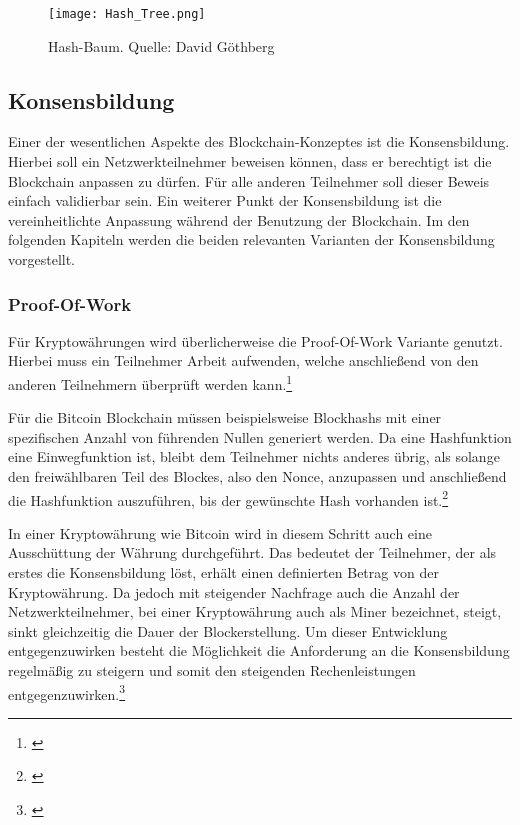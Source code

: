 \begin{figure}[!h]
	\texttt{[image: Hash\_Tree.png]}
	\caption{Hash-Baum. Quelle: David Göthberg}
	\label{fig:hash-tree}
\end{figure}

\subsection{Konsensbildung}
\label{subsec:Konsensbildung}
Einer der wesentlichen Aspekte des Blockchain-Konzeptes ist die Konsensbildung. Hierbei soll ein Netzwerkteilnehmer beweisen können, dass er berechtigt ist die Blockchain anpassen zu dürfen. Für alle anderen Teilnehmer soll dieser Beweis einfach validierbar sein. Ein weiterer Punkt der Konsensbildung ist die vereinheitlichte Anpassung während der Benutzung der Blockchain. Im den folgenden Kapiteln werden die beiden relevanten Varianten der Konsensbildung vorgestellt.

\subsubsection{Proof-Of-Work}
\label{subsec:proofofwork}
Für Kryptowährungen wird überlicherweise die Proof-Of-Work Variante genutzt. Hierbei muss ein Teilnehmer Arbeit aufwenden, welche anschließend von den anderen Teilnehmern überprüft werden kann.\footnote{\cite[S.~314]{Neugebauer.2018}}

Für die Bitcoin Blockchain müssen beispielsweise Blockhashs mit einer spezifischen Anzahl von führenden Nullen generiert werden. Da eine Hashfunktion eine Einwegfunktion ist, bleibt dem Teilnehmer nichts anderes übrig, als solange den freiwählbaren Teil des Blockes, also den Nonce, anzupassen und anschließend die Hashfunktion auszuführen, bis der gewünschte Hash vorhanden ist.\footnote{\cite[S.~314]{Neugebauer.2018}}

In einer Kryptowährung wie Bitcoin wird in diesem Schritt auch eine Ausschüttung der Währung durchgeführt. Das bedeutet der Teilnehmer, der als erstes die Konsensbildung löst, erhält einen definierten Betrag von der Kryptowährung. Da jedoch mit steigender Nachfrage auch die Anzahl der Netzwerkteilnehmer, bei einer Kryptowährung auch als Miner bezeichnet, steigt, sinkt gleichzeitig die Dauer der Blockerstellung. Um dieser Entwicklung entgegenzuwirken besteht die Möglichkeit die Anforderung an die Konsensbildung regelmäßig zu steigern und somit den steigenden Rechenleistungen entgegenzuwirken.\footnote{\cite[S.~315]{Neugebauer.2018}}

